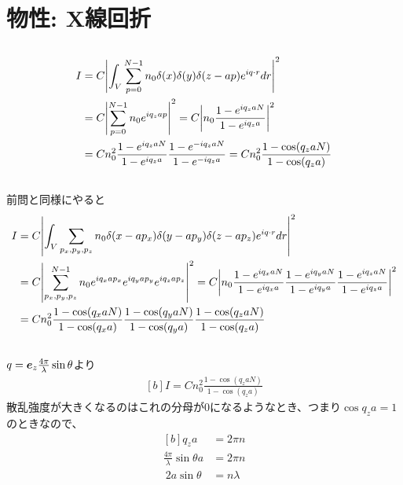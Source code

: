 \documentclass[../../sp_2017.tex]{subfiles}
\begin{document}
\setcounter{section}{4}
\section{物性: X線回折}
\subsection{}
\begin{equation}\begin{aligned}[b]
    I &= C \abs{\int_V\sum_{p=0}^{N-1}n_0\delta(x)\delta(y)\delta(z-ap)e^{i q\cdot r}dr}^2\\
    &= C\abs{\sum_{p=0}^{N-1}n_0e^{iq_z ap}}^2
    = C\abs{n_0\frac{1-e^{iq_zaN}}{1-e^{iq_za}}}^2\\
    &= Cn_0^2\frac{1-e^{iq_zaN}}{1-e^{iq_za}}\frac{1-e^{-iq_zaN}}{1-e^{-iq_za}}
    =Cn_0^2\frac{1-\cos(q_zaN)}{1-\cos(q_za)}
\end{aligned}\end{equation}

\subsection{}
前問と同様にやると
\begin{equation}\begin{aligned}[b]
    I &= C \abs{\int_V\sum_{p_x,p_y,p_z}n_0\delta(x-ap_x)\delta(y-ap_y)\delta(z-ap_z)e^{i q\cdot r}dr}^2\\
    &= C\abs{\sum_{p_x,p_y,p_z}^{N-1}n_0e^{iq_x ap_x}e^{iq_y ap_y}e^{iq_z ap_z}}^2
    = C\abs{n_0\frac{1-e^{iq_xaN}}{1-e^{iq_xa}}\frac{1-e^{iq_yaN}}{1-e^{iq_ya}}\frac{1-e^{iq_zaN}}{1-e^{iq_za}}}^2\\
    &=Cn_0^2\frac{1-\cos(q_xaN)}{1-\cos(q_xa)}\frac{1-\cos(q_yaN)}{1-\cos(q_ya)}\frac{1-\cos(q_zaN)}{1-\cos(q_za)}
\end{aligned}\end{equation}

\subsection{}
\(q= \vb*{e}_z\frac{4\pi}{\lambda}\sin\theta\)より
\begin{equation}\begin{aligned}[b]
    I = Cn_0^2\frac{1-\cos(q_zaN)}{1-\cos(q_za)}
\end{aligned}\end{equation}
散乱強度が大きくなるのはこれの分母が\(0\)になるようなとき、つまり\(\cos q_za=1\)のときなので、
\begin{equation}\begin{aligned}[b]
    q_za &= 2\pi n\\
    \frac{4\pi}{\lambda}\sin\theta a&=2\pi n\\\
    2a\sin\theta &= n\lambda
\end{aligned}\end{equation}
\end{document}
